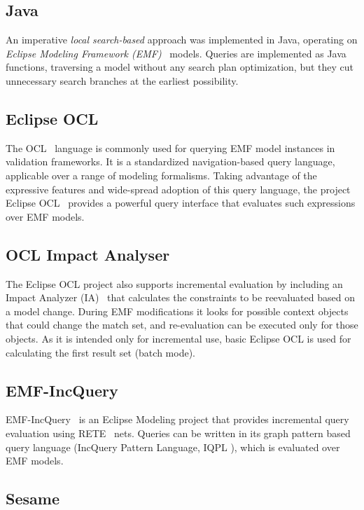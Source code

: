 \subsection{Java}
An imperative \emph{local search-based} approach was implemented in Java, operating on \emph{Eclipse Modeling Framework (EMF)}~\cite{EMF} models. Queries are implemented as Java functions, traversing a model without any search plan optimization, but they cut unnecessary search branches at the earliest possibility.

\subsection{Eclipse OCL}

The OCL~\cite{OCL} language is commonly used for querying EMF model instances in validation frameworks. It is a standardized navigation-based query language, applicable over a range of modeling formalisms. Taking advantage of the expressive features and wide-spread adoption of this query language, the project Eclipse OCL~\cite{EclipseOCL} provides a powerful query interface that evaluates such expressions over EMF models.

\subsection{OCL Impact Analyser}
The Eclipse OCL project also supports incremental evaluation by including an Impact Analyzer (IA)~\cite{ocl-ia2} that calculates the constraints to be reevaluated based on a model change. During EMF modifications it looks for possible context objects that could change the match set, and re-evaluation can be executed only for those objects. As it is intended only for incremental use, basic Eclipse OCL is used for calculating the first result set (batch mode).

\subsection{EMF-IncQuery}

EMF-IncQuery~\cite{models10} is an Eclipse Modeling project that provides incremental query evaluation using RETE~\cite{rete} nets. Queries can be written in its graph pattern based query language (IncQuery Pattern Language, IQPL \cite{iqpl}), which is evaluated over EMF models.

\subsection{Sesame}

